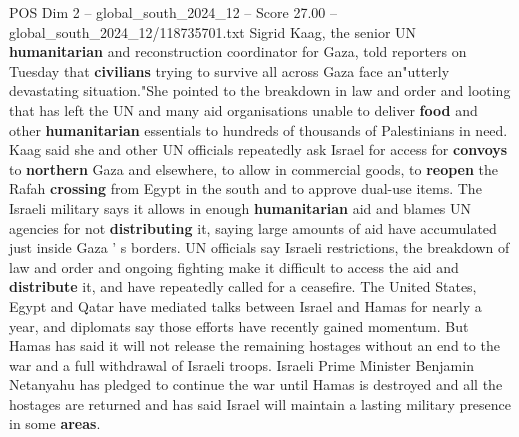 \begin{textsample}{POS Dim 2 – global\_south\_2024\_12 – Score 27.00 – global\_south\_2024\_12/118735701.txt}
Sigrid Kaag, the senior UN \textbf{humanitarian} and reconstruction coordinator for Gaza, told reporters on Tuesday that \textbf{civilians} trying to survive all across Gaza face an"utterly devastating situation."She pointed to the breakdown in law and order and looting that has left the UN and many aid organisations unable to deliver \textbf{food} and other \textbf{humanitarian} essentials to hundreds of thousands of Palestinians in need.
Kaag said she and other UN officials repeatedly ask Israel for access for \textbf{convoys} to \textbf{northern} Gaza and elsewhere, to allow in commercial goods, to \textbf{reopen} the Rafah \textbf{crossing} from Egypt in the south and to approve dual-use items.
The Israeli military says it allows in enough \textbf{humanitarian} aid and blames UN agencies for not \textbf{distributing} it, saying large amounts of aid have accumulated just inside Gaza ' s borders.
UN officials say Israeli restrictions, the breakdown of law and order and ongoing fighting make it difficult to access the aid and \textbf{distribute} it, and have repeatedly called for a ceasefire.
The United States, Egypt and Qatar have mediated talks between Israel and Hamas for nearly a year, and diplomats say those efforts have recently gained momentum.
But Hamas has said it will not release the remaining hostages without an end to the war and a full withdrawal of Israeli troops.
Israeli Prime Minister Benjamin Netanyahu has pledged to continue the war until Hamas is destroyed and all the hostages are returned and has said Israel will maintain a lasting military presence in some \textbf{areas}.

\end{textsample}
